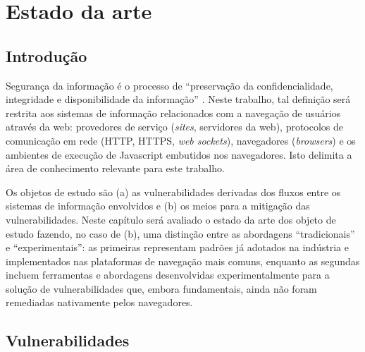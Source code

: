 \chapter{Estado da arte}
\section{Introdução}
Segurança da informação é o processo de ``preservação da confidencialidade, integridade e disponibilidade da informação'' \cite{ISO2016}. Neste trabalho, tal definição será restrita aos sistemas de informação relacionados com a navegação de usuários através da web: provedores de serviço (\textit{sites}, servidores da web), protocolos de comunicação em rede (HTTP, HTTPS, \textit{web sockets}), navegadores (\textit{browsers}) e os ambientes de execução de Javascript embutidos nos navegadores. Isto delimita a área de conhecimento relevante para este trabalho.

Os objetos de estudo são (a) as vulnerabilidades derivadas dos fluxos \cite{Goguen1982} \cite{Denning1976} entre os sistemas de informação envolvidos e (b) os meios para a mitigação das vulnerabilidades. Neste capítulo será avaliado o estado da arte dos objeto de estudo fazendo, no caso de (b), uma distinção entre as abordagens ``tradicionais'' e ``experimentais'': as primeiras representam padrões já adotados na indústria e implementados nas plataformas de navegação mais comuns, enquanto as segundas incluem ferramentas e abordagens desenvolvidas experimentalmente para a solução de vulnerabilidades que, embora fundamentais, ainda não foram remediadas nativamente pelos navegadores.


\section{Vulnerabilidades}

